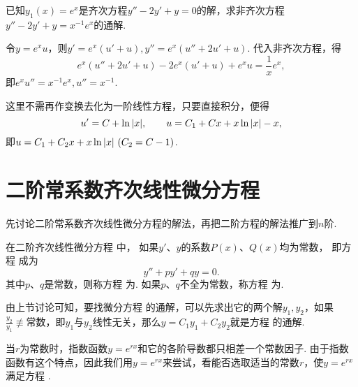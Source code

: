 \begin{example}
已知\(y_1(x) = e^x\)是齐次方程\(y'' - 2y' + y = 0\)的解，求非齐次方程\(y'' - 2y' + y = x^{-1} e^x\)的通解.
\begin{solution}
令\(y = e^x u\)，则\(y' = e^x (u'+u), y'' = e^x (u''+2u'+u)\).
代入非齐次方程，得\[
e^x (u''+2u'+u) - 2e^x (u'+u) + e^x u = \frac{1}{x} e^x,
\]即\(e^x u'' = x^{-1} e^x, u'' = x^{-1}\).

这里不需再作变换去化为一阶线性方程，只要直接积分，便得\[
u' = C + \ln\abs{x},
\qquad
u = C_1 + C x + x\ln\abs{x} - x,
\]即\(u = C_1 + C_2 x + x \ln\abs{x}\ (C_2=C-1)\).
\end{solution}
\end{example}

\section{二阶常系数齐次线性微分方程}\label{section:微分方程.常系数齐次线性微分方程}
先讨论二阶常系数齐次线性微分方程的解法，再把二阶方程的解法推广到\(n\)阶.

\begin{definition}
在二阶齐次线性微分方程  中，
如果\(y'\)、\(y\)的系数\(P(x)\)、\(Q(x)\)均为常数，
即方程  成为
\begin{equation}\label{equation:微分方程.二阶常系数齐次线性微分方程的一般形式}
y''+py'+qy=0.
\end{equation}
其中\(p\)、\(q\)是常数，则称方程  为.
如果\(p\)、\(q\)不全为常数，称方程  为.
\end{definition}

由上节讨论可知，要找微分方程  的通解，可以先求出它的两个解\(y_1, y_2\)，如果\(\frac{y_2}{y_1} \not\equiv \text{常数}\)，即\(y_1\)与\(y_2\)线性无关，那么\(y = C_1 y_1 + C_2 y_2\)就是方程  的通解.

当\(r\)为常数时，指数函数\(y = e^{r x}\)和它的各阶导数都只相差一个常数因子.
由于指数函数有这个特点，因此我们用\(y = e^{rx}\)来尝试，看能否选取适当的常数\(r\)，使\(y = e^{rx}\)满足方程 .

